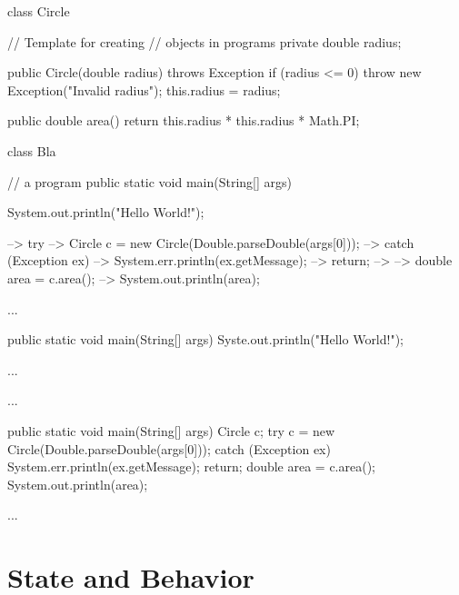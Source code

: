 \documentclass[a4paper, 9pt]{extarticle}
\begin{document}
\begin{multicols}{2}
\begin{blackboard}
class Circle { // Template for creating
               // objects in programs
  private double radius;

  public Circle(double radius) throws Exception {
    if (radius <= 0) {
      throw new Exception("Invalid radius");
    }
    this.radius = radius;
  }

  public double area() {
    return this.radius * this.radius * Math.PI;
  }
}
\end{blackboard}
\columnbreak
\begin{blackboard}
class Bla {  // a program
  public static void main(String[] args)  {

    System.out.println("Hello World!");

-->    try {
-->      Circle c = new Circle(Double.parseDouble(args[0]));
-->    } catch (Exception ex) {
-->      System.err.println(ex.getMessage);
-->      return;
-->    }
-->    double area = c.area();
-->    System.out.println(area);
  }
}
\end{blackboard}
\end{multicols}


\begin{multicols}{2}
\begin{blackboard}

  ...

  public static void main(String[] args)  {
    Syste.out.println("Hello World!");
  }

  ...

\end{blackboard}
\columnbreak
\begin{blackboard}

  ...

  public static void main(String[] args)  {
    Circle c;
    try {
      c = new Circle(Double.parseDouble(args[0]));
    } catch (Exception ex) {
      System.err.println(ex.getMessage);
      return;
    }
    double area = c.area();
    System.out.println(area);
  }

  ...

\end{blackboard}
\end{multicols}









\section{State and Behavior}
\end{document}
